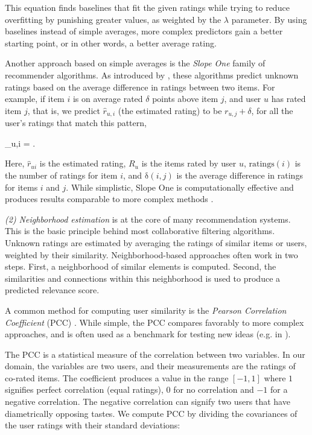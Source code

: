 This equation finds baselines that fit the given ratings while trying to reduce overfitting
by punishing greater values, as weighted by the $\lambda$ parameter. 
By using baselines instead of simple averages, more complex predictors gain a better starting point,
or in other words, a better average rating.

Another approach based on simple averages is the  \emph{Slope One} family of recommender algorithms. 
As introduced by \cite{Lemire2005}, these algorithms predict unknown ratings based on the average difference in ratings between two items. 
For example, if item $i$ is on average rated $\delta$ points above item $j$, and user $u$ has rated item $j$,
that is, we predict $\hat{r}_{u,i}$ (the estimated rating) to be $r_{u,j} + \delta$, for all the user's ratings that match this pattern,

\begin{eqsp}
  _{u,i} = .
\end{eqsp}

Here, $\hat{r}_{ui}$ is the estimated rating, $R_u$ is the items rated by user $u$, $\mathrm{ratings}(i)$ is the number of ratings for item $i$,
and $\mathrm{\delta}(i,j)$ is the average difference in ratings for items $i$ and $j$.
While simplistic, Slope One is computationally effective and produces results comparable to more complex methods \cite[p.5]{Lemire2005}.

\vspace{2em}

\noindent
\emph{(2) Neighborhood estimation} is at the core of many recommendation systems. 
This is the basic principle behind most collaborative filtering algorithms. 
Unknown ratings are estimated by averaging the ratings of similar items or users, weighted by their similarity.
Neighborhood-based approaches often work in two steps. First, a neighborhood of similar elements is computed.
Second, the similarities and connections within this neighborhood is used to produce a 
predicted relevance score.

A common method for computing user similarity is the \emph{Pearson Correlation Coefficient} (PCC) \cite[p.11]{Segaran2007}.
While simple, the PCC compares favorably to more complex approaches, and is often used as a benchmark 
for testing new ideas (e.g. in \citet{Lemire2005, Ujjin, Konstas}).

The PCC is a statistical measure of the correlation between two variables. In our domain, the variables
are two users, and their measurements are the ratings of co-rated items. 
The coefficient produces a value in the range $[-1,1]$ where $1$ signifies perfect correlation (equal ratings),
$0$ for no correlation and $-1$ for a negative correlation.
The negative correlation can signify two users that have diametrically opposing tastes.
We compute PCC by dividing the covariances of the user ratings with their standard deviations:

